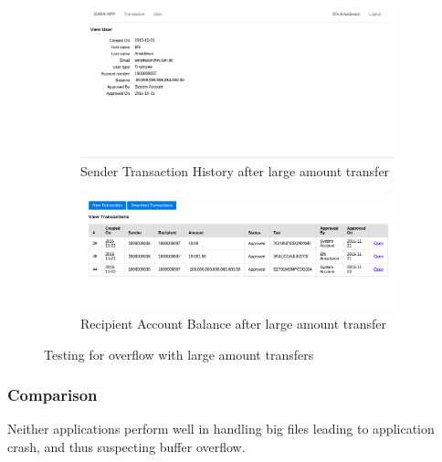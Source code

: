 \begin{figure}[ht]
	\centering
	\begin{subfigure}{.45\textwidth}
		\centering
		\includegraphics[width=.9\linewidth]{figures/OTG-INPVAL-014_3.png}
		\caption{Sender Transaction History after large amount transfer}
	\end{subfigure}\hfill%
	\begin{subfigure}{.45\textwidth}
		\centering
		\includegraphics[width=.9\linewidth]{figures/OTG-INPVAL-014_4.png}
		\caption{Recipient Account Balance after large amount transfer}
	\end{subfigure}
	\caption{Testing for overflow with large amount transfers}
	\label{fig:overflow_account_history}
\end{figure}

\subsubsection{Comparison}
Neither applications perform well in handling big files leading to application crash, and thus suspecting buffer overflow.
\clearpage